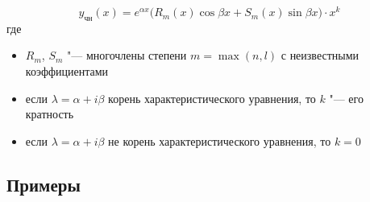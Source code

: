 \documentclass[11pt,a4paper]{article}
\newcommand{\ych}{y_{\text{чн}}}
\begin{document}
\[
  \ych(x) = e^{\alpha x}\bigl(R_m(x)\cos\beta x + S_m(x)\sin\beta x\bigr) \cdot x^k
\]
где
\begin{itemize}
  \item $R_m$, $S_m$ "--- многочлены степени $m = \max(n, l)$ с неизвестными коэффициентами
  \item если $\lambda = \alpha + i\beta$ корень характеристического уравнения, то $k$ "--- его кратность
  \item если $\lambda = \alpha + i\beta$ не корень характеристического уравнения, то $k = 0$
\end{itemize}

\newpage



\subsection*{Примеры}
\end{document}
